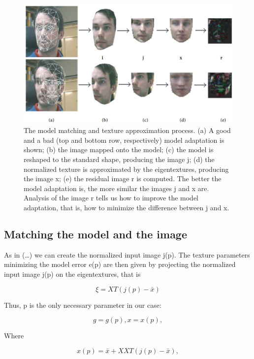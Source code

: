 \documentclass[12pt]{spieman}
\begin{document}
\begin{spacing}{2}
\begin{figure}[H]
    \centering
    \includegraphics[width=130mm]{Figure1.jpg}
    \caption{The model matching and texture approximation process. (a) A good and a bad (top and bottom row, respectively) model adaptation is shown; (b) the image mapped onto the model; (c) the model is reshaped to the standard shape, producing the image j; (d) the normalized texture is approximated by the eigentextures, producing the image x; (e) the residual image r is computed. The better the model adaptation is, the more similar the images j and x are. Analysis of the image r tells us how to improve the model adaptation, that is, how to minimize the difference between j and x.}
    \label{fig1}
\end{figure}



\subsection{Matching the model and the image}{}As in (…) we can create the normalized input image j(p). The texture parameters minimizing the model error e(p) are then given by projecting the normalized input image j(p) on the eigentextures, that is


\begin{equation}
    \xi = XT (j(p)- \bar{x})
\end{equation}

Thus, p is the only necessary parameter in our case:

\begin{equation}
    g = g(p), x = x(p),
\end{equation}

Where

\begin{equation}
    x(p)= \bar{x}+ XXT (j(p)- \bar{x}),
\end{equation}



\end{spacing}
\end{document}
